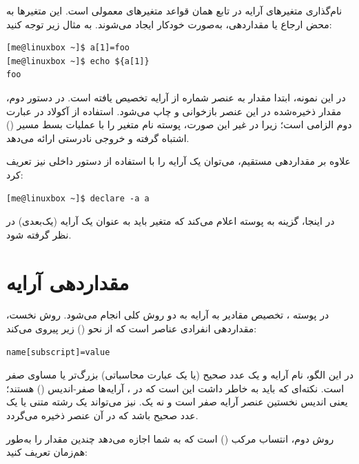 نام‌گذاری متغیرهای آرایه در  تابع همان قواعد متغیرهای معمولی است. این متغیرها به محض ارجاع یا مقداردهی، به‌صورت خودکار ایجاد می‌شوند. به مثال زیر توجه کنید:

\begin{latin}
\begin{lstlisting}
[me@linuxbox ~]$ a[1]=foo
[me@linuxbox ~]$ echo ${a[1]}
foo
\end{lstlisting}
\end{latin}

در این نمونه، ابتدا مقدار  به عنصر شماره  از آرایه  تخصیص یافته است. در دستور دوم، مقدار ذخیره‌شده در این عنصر بازخوانی و چاپ می‌شود. استفاده از آکولاد \cmd{\{ \}} در عبارت دوم الزامی است؛ زیرا در غیر این صورت، پوسته نام متغیر را با عملیات بسط مسیر () اشتباه گرفته و خروجی نادرستی ارائه می‌دهد.

علاوه بر مقداردهی مستقیم، می‌توان یک آرایه را با استفاده از دستور داخلی  نیز تعریف کرد:

\begin{latin}
\begin{lstlisting}
[me@linuxbox ~]$ declare -a a
\end{lstlisting}
\end{latin}

در اینجا، گزینه  به پوسته اعلام می‌کند که متغیر  باید به عنوان یک آرایه (یک‌بعدی) در نظر گرفته شود.

\section{مقداردهی آرایه}

در پوسته ، تخصیص مقادیر به آرایه به دو روش کلی انجام می‌شود. روش نخست، مقداردهی انفرادی عناصر است که از نحو () زیر پیروی می‌کند:

\begin{latin}
\begin{lstlisting}
name[subscript]=value
\end{lstlisting}
\end{latin}

در این الگو،  نام آرایه و  یک عدد صحیح (یا یک عبارت محاسباتی) بزرگ‌تر یا مساوی صفر است. نکته‌ای که باید به خاطر داشت این است که در ، آرایه‌ها صفر-اندیس () هستند؛ یعنی اندیس نخستین عنصر آرایه صفر است و نه یک.  نیز می‌تواند یک رشته متنی یا یک عدد صحیح باشد که در آن عنصر ذخیره می‌گردد.

روش دوم، انتساب مرکب () است که به شما اجازه می‌دهد چندین مقدار را به‌طور هم‌زمان تعریف کنید:

